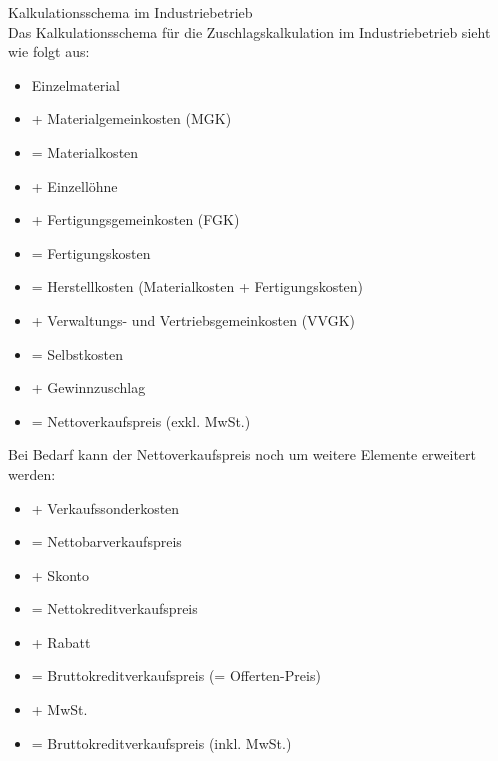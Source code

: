 \begin{definition}{Kalkulationsschema im Industriebetrieb}\\
Das Kalkulationsschema für die Zuschlagskalkulation im Industriebetrieb sieht wie folgt aus:
\begin{itemize}
    \item Einzelmaterial
    \item + Materialgemeinkosten (MGK)
    \item = Materialkosten
    \item + Einzellöhne
    \item + Fertigungsgemeinkosten (FGK)
    \item = Fertigungskosten
    \item = Herstellkosten (Materialkosten + Fertigungskosten)
    \item + Verwaltungs- und Vertriebsgemeinkosten (VVGK)
    \item = Selbstkosten
    \item + Gewinnzuschlag
    \item = Nettoverkaufspreis (exkl. MwSt.)
\end{itemize}

Bei Bedarf kann der Nettoverkaufspreis noch um weitere Elemente erweitert werden:
\begin{itemize}
    \item + Verkaufssonderkosten
    \item = Nettobarverkaufspreis
    \item + Skonto
    \item = Nettokreditverkaufspreis
    \item + Rabatt
    \item = Bruttokreditverkaufspreis (= Offerten-Preis)
    \item + MwSt.
    \item = Bruttokreditverkaufspreis (inkl. MwSt.)
\end{itemize}
\end{definition}

